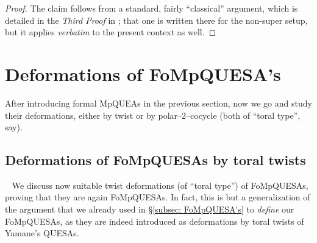 \documentclass[12pt,reqno,twoside,a4paper]{amsart}
\numberwithin{equation}{section}
\theoremstyle{definition}
\newtheorem{free text}[lema]{}
\theoremstyle{remark}
\theoremstyle{plain}
\begin{document}
\begin{proof}
%
 The claim follows from a standard, fairly ``classical'' argument, which is detailed in the  \textsl{Third Proof\/}  in  \cite[\S 4.4.9]{GG3};  that one is written there for the non-super setup, but it applies  \textit{verbatim\/}  to the present context as well.
%
\end{proof}


\bigskip
 \medskip


\section{Deformations of FoMpQUESA's}  \label{sec: deform-FoMpQUESA's}
%
 \vskip11pt
%
   After introducing formal MpQUEAs in the previous section, now we go and study their deformations, either by twist or by  polar--$ 2 $--cocycle  (both of ``toral type'', say).

\vskip13pt


\subsection{Deformations of FoMpQUESAs by toral twists}  \label{subsec: tw-def_FoMpQUESAs}
%
 {\ }
%
 \vskip9pt
%
   We discuss now suitable twist deformations (of ``toral type'') of FoMpQUESAs,
   proving that they are again FoMpQUESAs.
   In fact, this is but a generalization of the argument that we already used in
   \S \ref{subsec: FoMpQUESA's}  to  \textsl{define\/}  our FoMpQUESAs,
   as they are indeed introduced as deformations by toral twists of Yamane's QUESAs.

\vskip9pt
\end{document}
